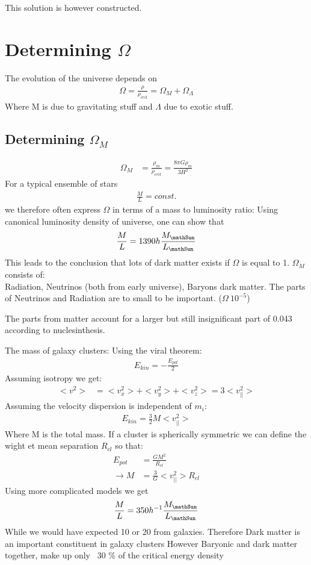 \documentclass[11pt,a4paper]{article}
\begin{document}
This solution is however constructed.

\section {Determining \texorpdfstring{$\Omega$}{TEXT}}
The evolution of the universe depends on
\begin{align*}
    \Omega = \frac {\rho} {\rho_{crit}} = \Omega_M + \Omega_\Lambda
\end{align*}
Where M is due to gravitating stuff and $\Lambda$ due to exotic stuff.
\subsection{Determining \texorpdfstring{$\Omega_M$}{TEXT}}
\begin{align*}
    \Omega_M &= \frac {\rho_m}{\rho_{crit}} = \frac {8 \pi G \rho_m}{3 H^2}
\end{align*}
For a typical ensemble of stars 
\begin{align*}
   \frac M L = const. 
\end{align*}
we therefore often express $\Omega$ in terms of a mass to luminosity ratio:
Using canonical luminosity density of universe, one can show that
\begin{align*}
    \frac M L = 1390 h \frac {M_{\mathSun}} {L_\mathSun}
\end{align*}
This leads to the conclusion that lots of dark matter exists if $\Omega$ is equal to 1.
$\Omega_M$ consists of: \\
Radiation, Neutrinos (both from early universe), Baryons dark matter. 
The parts of Neutrinos and Radiation are to small to be important. ($\Omega ~ 10^{-5}$)

The parts from matter account for a larger but still insignificant part of 0.043 according to nuclesinthesis.

The mass of galaxy clusters:
Using the viral theorem:
\begin{align*}
    E_{kin}  = - \frac {E_{pot}}{2}
\end{align*}
Assuming isotropy we get: 
\begin{align*}
    <v^2> &=  <v_x^2>+<v_y^2>+<v_z^2> = 3 <v_{||}^2 >
\end{align*}
Assuming the velocity dispersion is independent of $m_i$:
\begin{align*}
    E_{kin} = \frac 3 2 M <v_{||}^2> 
\end{align*}
Where M is the total mass. 
If a cluster is spherically symmetric we can define the wight et mean separation $R_{cl}$ so that:
\begin{align*}
    E_{pot}  &=  \frac {GM^2}{R_{cl}} \\
    \rightarrow M &= \frac 3 G <v^2_{||}> R_{cl}
\end{align*}
Using more complicated models we get
\begin{align*}
    \frac M L = 350 h^{-1} \frac {M_{\mathSun}} {L_\mathSun}
\end{align*}
While we would have expected 10 or 20 from galaxies.
Therefore Dark matter is an important
constituent in galaxy clusters
However Baryonic and dark matter together, make up only ~30 \%
of the critical energy density
\end{document}
